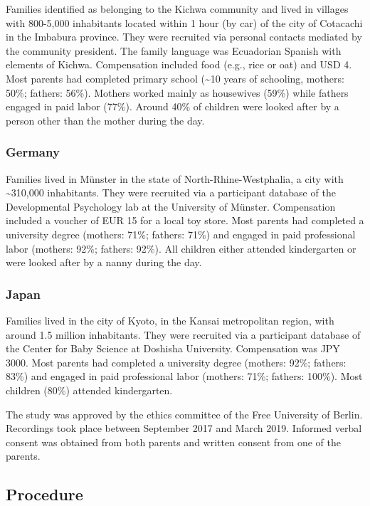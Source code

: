 \documentclass[
  man,floatsintext]{apa6}
\begin{document}
Families identified as belonging to the Kichwa community and lived in villages with 800-5,000 inhabitants located within 1 hour (by car) of the city of Cotacachi in the Imbabura province. They were recruited via personal contacts mediated by the community president. The family language was Ecuadorian Spanish with elements of Kichwa. Compensation included food (e.g., rice or oat) and USD 4. Most parents had completed primary school (\textasciitilde10 years of schooling, mothers: 50\%; fathers: 56\%). Mothers worked mainly as housewives (59\%) while fathers engaged in paid labor (77\%). Around 40\% of children were looked after by a person other than the mother during the day.

\hypertarget{germany}{%
\subsubsection{Germany}\label{germany}}

Families lived in Münster in the state of North-Rhine-Westphalia, a city with \textasciitilde310,000 inhabitants. They were recruited via a participant database of the Developmental Psychology lab at the University of Münster. Compensation included a voucher of EUR 15 for a local toy store. Most parents had completed a university degree (mothers: 71\%; fathers: 71\%) and engaged in paid professional labor (mothers: 92\%; fathers: 92\%). All children either attended kindergarten or were looked after by a nanny during the day.

\hypertarget{japan}{%
\subsubsection{Japan}\label{japan}}

Families lived in the city of Kyoto, in the Kansai metropolitan region, with around 1.5 million inhabitants. They were recruited via a participant database of the Center for Baby Science at Doshisha University. Compensation was JPY 3000. Most parents had completed a university degree (mothers: 92\%; fathers: 83\%) and engaged in paid professional labor (mothers: 71\%; fathers: 100\%). Most children (80\%) attended kindergarten.

The study was approved by the ethics committee of the Free University of Berlin. Recordings took place between September 2017 and March 2019. Informed verbal consent was obtained from both parents and written consent from one of the parents.

\hypertarget{procedure}{%
\subsection{Procedure}\label{procedure}}
\end{document}
